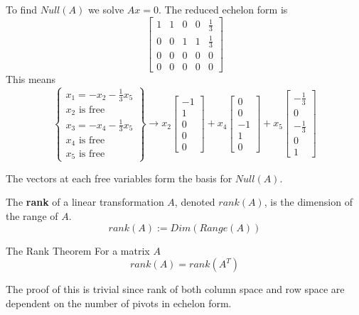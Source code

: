 To find $Null(A)$ we solve $Ax = 0$. The reduced echelon form is 
$$\begin{bmatrix}
1 & 1 & 0 & 0 & \frac{1}{3} \\
0 & 0 & 1 & 1 & \frac{1}{3} \\
0 & 0 & 0 & 0 & 0 \\
0 & 0 & 0 & 0 & 0
\end{bmatrix}$$
This means 
$$ \left\{ \begin{matrix}
x_{1} = -x_{2} - \frac{1}{3} x_{5} \\
x_{2} \text{ is free} \\
x_{3} = -x_{4} - \frac{1}{3} x_{5} \\
x_{4} \text{ is free} \\
x_{5} \text{ is free}
\end{matrix} \right\} \longrightarrow x_{2} \begin{bmatrix}
-1 \\
1 \\ 
0 \\
0 \\
0
\end{bmatrix} + x_{4} \begin{bmatrix}
0 \\ 
0 \\
-1 \\
1 \\
0
\end{bmatrix} + x_{5} \begin{bmatrix}
-\frac{1}{3} \\
0 \\
-\frac{1}{3} \\
0 \\
1
\end{bmatrix}$$

The vectors at each free variables form the basis for $Null(A)$. 

\begin{definition}
The \textbf{rank} of a linear transformation $A$, denoted $rank(A)$, is the dimension of the range of $A$. 
$$rank(A) := Dim(Range(A))$$
\end{definition}

\begin{theorem}{The Rank Theorem}
For a matrix $A$ 
$$rank(A) = rank(A^{T})$$

The proof of this is trivial since rank of both column space and row space are dependent on the number of pivots in echelon form. 
\end{theorem}

